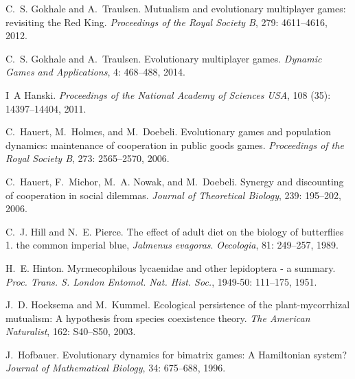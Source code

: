\documentclass[12pt]{article}
\begin{document}
\begin{thebibliography}{61}
C.~S. Gokhale and A.~Traulsen.
\newblock Mutualism and evolutionary multiplayer games: revisiting the {R}ed
  {K}ing.
\newblock \emph{Proceedings of the Royal Society B}, 279: 4611--4616,
  2012.

C.~S. Gokhale and A.~Traulsen.
\newblock Evolutionary multiplayer games.
\newblock \emph{Dynamic Games and Applications}, 4: 468--488, 2014.

I~A Hanski.
\newblock \emph{Proceedings of the National Academy of Sciences USA},
  108 (35): 14397--14404, 2011.

C.~Hauert, M.~Holmes, and M.~Doebeli.
\newblock Evolutionary games and population dynamics: maintenance of
  cooperation in public goods games.
\newblock \emph{Proceedings of the Royal Society B}, 273: 2565--2570,
  2006{}.

C.~Hauert, F.~Michor, M.~A. Nowak, and M.~Doebeli.
\newblock Synergy and discounting of cooperation in social dilemmas.
\newblock \emph{Journal of Theoretical Biology}, 239: 195--202,
  2006{}.

C.~J. Hill and N.~E. Pierce.
\newblock The effect of adult diet on the biology of butterflies 1. the common
  imperial blue, \textit{Jalmenus evagoras}.
\newblock \emph{Oecologia}, 81: 249--257, 1989.

H.~E. Hinton.
\newblock Myrmecophilous lycaenidae and other lepidoptera - a summary.
\newblock \emph{Proc. Trans. S. London Entomol. Nat. Hist. Soc.},
  1949-50: 111--175, 1951.

J.~D. Hoeksema and M.~Kummel.
\newblock Ecological persistence of the plant-mycorrhizal mutualism: A
  hypothesis from species coexistence theory.
\newblock \emph{The American Naturalist}, 162: S40--S50, 2003.

J.~Hofbauer.
\newblock Evolutionary dynamics for bimatrix games: A {H}amiltonian system?
\newblock \emph{Journal of Mathematical Biology}, 34: 675--688, 1996.


\end{thebibliography}
\end{document}
